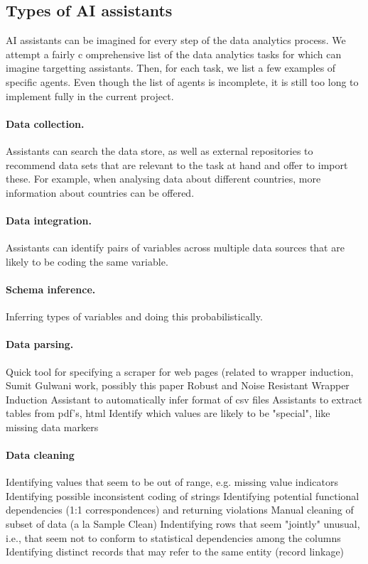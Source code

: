 \documentclass[sigplan,preprint,10pt]{acmart}\settopmatter{printfolios=true,printccs=false,printacmref=false}
\theoremstyle{plain}
\theoremstyle{definition}
\begin{document}
\subsection{Types of AI assistants}
{\color{blue}
AI assistants can be imagined for every step of the data analytics process. We attempt a fairly c
omprehensive list of the data analytics tasks for which can imagine targetting assistants. Then, 
for each task, we list a few examples of specific agents. Even though the list of agents is 
incomplete, it is still too long to implement fully in the current project.

\paragraph{Data collection.} Assistants can search the data store, as well as external repositories
to recommend data sets that are relevant to the task at hand and offer to import these. For example,
when analysing data about different countries, more information about countries can be offered.

\paragraph{Data integration.} Assistants can identify pairs of variables across multiple data 
sources that are likely to be coding the same variable. 

\paragraph{Schema inference.} Inferring types of variables and doing this probabilistically.

\paragraph{Data parsing.}
Quick tool for specifying a scraper for web pages (related to wrapper induction, Sumit Gulwani 
work, possibly this paper Robust and Noise Resistant Wrapper Induction
Assistant to automatically infer format of csv files
Assistants to extract tables from pdf's, html
Identify which values are likely to be "special", like missing data markers

\paragraph{Data cleaning}
Identifying values that seem to be out of range, e.g. missing value indicators
Identifying possible inconsistent coding of strings
Identifying potential functional dependencies (1:1 correspondences) and returning violations
Manual cleaning of subset of data (a la Sample Clean)
Indentifying rows that seem "jointly" unusual, i.e., that seem not to conform to statistical dependencies among the columns
Identifying distinct records that may refer to the same entity (record linkage)

}
\end{document}
